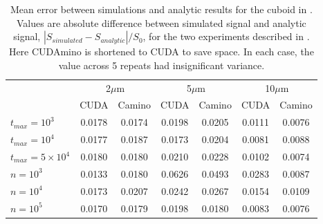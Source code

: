 

\begin{table}
  \centering
  \begin{tabular}{lcccccc}
    \hline
    & \multicolumn{2}{c}{2$\mu$m} & \multicolumn{2}{c}{5$\mu$m} & \multicolumn{2}{c}{10$\mu$m}\\
    & CUDA & Camino & CUDA & Camino & CUDA & Camino \\\hline
    $t_{max}=10^3$ & 0.0178 & 0.0174 & 0.0198 & 0.0205 & 0.0111 & 0.0076\\
    $t_{max}=10^4$ & 0.0177 & 0.0187 & 0.0173 & 0.0204 & 0.0081 & 0.0088\\
    $t_{max}=5\times10^4$ & 0.0180 & 0.0180 & 0.0210 & 0.0228 & 0.0102 & 0.0074\\\rule{0pt}{3ex}
    $n=10^3$ & 0.0133 & 0.0180 & 0.0626 & 0.0493 & 0.0283 & 0.0087 \\
    $n=10^4$ & 0.0173 & 0.0207 & 0.0242 & 0.0267 & 0.0154 & 0.0109 \\
    $n=10^5$ & 0.0170 & 0.0179 & 0.0198 & 0.0180 & 0.0083 & 0.0076 \\

    \hline
  \end{tabular}
  \caption{Mean error between simulations and analytic results for the cuboid in . Values are absolute difference between simulated signal and analytic signal, $|S_{simulated} - S_{analytic}|/S_0$, for the two experiments described in . Here CUDAmino is shortened to CUDA to save space. In each case, the value across 5 repeats had insignificant variance.}
  \label{tab:cuboid_results}
\end{table}


